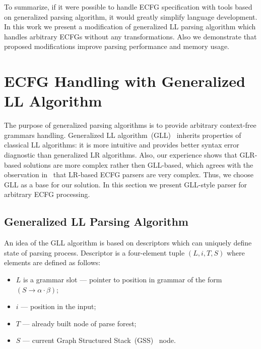 \documentclass[runningheads,a4paper]{llncs}
\begin{document}
To summarize, if it were possible to handle ECFG specification with tools based on generalized parsing algorithm, it would greatly simplify language development.
In this work we present a modification of generalized LL parsing algorithm which handles arbitrary ECFGs without any transformations.
Also we demonstrate that proposed modifications improve parsing performance and memory usage.

\section{ECFG Handling with Generalized LL Algorithm}%

The purpose of generalized parsing algorithms is to provide arbitrary context-free grammars handling.
Generalized LL algorithm~(GLL)~\cite{scott2010gll} inherits properties of classical LL algorithms: it is more intuitive and provides better syntax error diagnostic than generalized LR algorithms.
Also, our experience shows that GLR-based solutions are more complex rather then GLL-based, which agrees with the observation in~\cite{ECFG} that LR-based ECFG parsers are very complex. 
Thus, we choose GLL as a base for our solution.
In this section we present GLL-style parser for arbitrary ECFG processing.

\subsection{Generalized LL Parsing Algorithm}%

An idea of the GLL algorithm is based on descriptors which can uniquely define state of parsing process.
Descriptor is a four-element tuple $(L, i, T, S)$ where elements are defined as follows: 
\begin{itemize}
\item $L$ is a grammar slot --- pointer to position in grammar of the form~$(S \to \alpha \cdot \beta)$;
\item $i$ --- position in the input;
\item $T$ --- already built node of parse forest;
\item $S$ --- current Graph Structured Stack~(GSS)~\cite{afroozeh2015faster} node.
\end{itemize}
\end{document}
